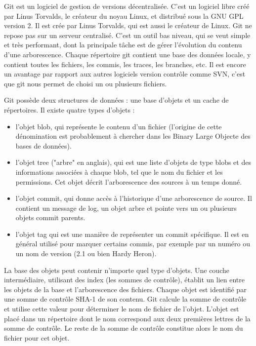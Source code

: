 Git est un logiciel de gestion de versions décentralisée. C'est un logiciel libre créé par Linus Torvalds, le créateur du noyau Linux, et distribué sous la GNU GPL version 2. Il est crée par Linus Torvalds, qui est aussi le créateur de Linux. Git ne repose pas sur un serveur centralisé. C'est un outil bas niveau, qui se veut simple et très performant, dont la principale tâche est de gérer l'évolution du contenu d'une arborescence. Chaque répertoire git contient une base des données locale, y contient toutes les fichiers, les commis, les traces, les branches, etc. Il est encore un avantage par rapport aux autres logiciels version contrôle comme SVN, c'est que git nous permet de choisi un ou plusieurs fichiers. 

Git possède deux structures de données : une base d'objets et un cache de répertoires. Il existe quatre types d'objets :

\begin{itemize}
	\item l'objet blob, qui représente le contenu d'un fichier (l'origine de cette dénomination est probablement à chercher dans les Binary Large Objecte des bases de données).
	\item l'objet tree ("arbre" en anglais), qui est une liste d'objets de type blobs et des informations associées à chaque blob, tel que le nom du fichier et les permissions. Cet objet décrit l'arborescence des sources à un temps donné.
	\item l'objet commit, qui donne accès à l'historique d'une arborescence de source. Il contient un message de log, un objet arbre et pointe vers un ou plusieurs objets commit parents.
	\item l'objet tag qui est une manière de représenter un commit spécifique. Il est en général utilisé pour marquer certains commis, par exemple par un numéro ou un nom de version (2.1 ou bien Hardy Heron).
\end{itemize}

La base des objets peut contenir n'importe quel type d'objets. Une couche intermédiaire, utilisant des index (les sommes de contrôle), établit un lien entre les objets de la base et l'arborescence des fichiers.
Chaque objet est identifié par une somme de contrôle SHA-1 de son contenu. Git calcule la somme de contrôle et utilise cette valeur pour déterminer le nom de fichier de l'objet. L'objet est placé dans un répertoire dont le nom correspond aux deux premières lettres de la somme de contrôle. Le reste de la somme de contrôle constitue alors le nom du fichier pour cet objet.

